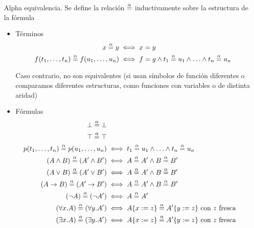 \begin{definition}{Alpha equivalencia}. Se define la relación $\overset{\alpha}{=}$ inductivamente sobre la estructura de la fórmula
    \begin{itemize}
        \item Términos
        \begin{align*}
            x \overset{\alpha}{=} y &\iff x = y\\
            f(t_1, \dots, t_n)
            \overset{\alpha}{=}
            f(u_1, \dots, u_n)
            &\iff f = g \wedge
                t_1 \overset{\alpha}{=} u_1 \wedge
                \dotso \wedge
                t_n \overset{\alpha}{=} u_n
        \end{align*}

        Caso contrario, no son equivalentes (si usan símbolos de función diferentes o comparamos diferentes estructuras, como funciones con variables o de distinta aridad) 
    
        \item Fórmulas
        \begin{align*}    
            \bot \overset{\alpha}{=} \bot
                \\
            \top \overset{\alpha}{=} \top
                \\
            p(t_1, \dots, t_n) \overset{\alpha}{=} p(u_1, \dots, u_n)
                &\iff
                t_1 \overset{\alpha}{=} u_1 \wedge
                \dotso \wedge
                t_n \overset{\alpha}{=} u_n
                \\
            (A \wedge B) \overset{\alpha}{=} (A' \wedge B')
                &\iff
                A \overset{\alpha}{=} A' \wedge B \overset{\alpha}{=} B'
                \\
            (A \vee B) \overset{\alpha}{=} (A' \vee B')
                &\iff
                A \overset{\alpha}{=} A' \wedge B \overset{\alpha}{=} B'
                \\
            (A \to B) \overset{\alpha}{=} (A' \to B')
                &\iff
                A \overset{\alpha}{=} A' \wedge B \overset{\alpha}{=} B'
                \\
            (\neg A) \overset{\alpha}{=} (\neg A')
                &\iff
                A \overset{\alpha}{=} A'
                \\
            (\forall x . A) \overset{\alpha}{=} (\forall y . A')
                &\iff
                A \{x := z\} \overset{\alpha}{=}
                A' \{y := z\} \text{ con $z$ fresca}
                \\
            (\exists x . A) \overset{\alpha}{=} (\exists y . A')
                &\iff
                A \{x := z\} \overset{\alpha}{=}
                A' \{y := z\} \text{ con $z$ fresca}
                \\
        \end{align*}


\end{itemize}
\end{definition}
